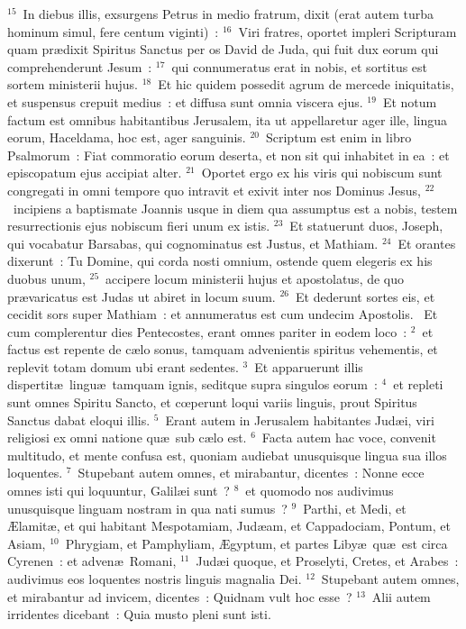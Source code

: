 ${}^{15}$~In diebus illis, exsurgens Petrus in medio fratrum, dixit (erat autem turba hominum simul, fere centum viginti)~:
${}^{16}$~Viri fratres, oportet impleri Scripturam quam pr\ae dixit Spiritus Sanctus per os David de Juda, qui fuit dux eorum qui comprehenderunt Jesum~:
${}^{17}$~qui connumeratus erat in nobis, et sortitus est sortem ministerii hujus.
${}^{18}$~Et hic quidem possedit agrum de mercede iniquitatis, et suspensus crepuit medius~: et diffusa sunt omnia viscera ejus.
${}^{19}$~Et notum factum est omnibus habitantibus Jerusalem, ita ut appellaretur ager ille, lingua eorum, Haceldama, hoc est, ager sanguinis.
${}^{20}$~Scriptum est enim in libro Psalmorum~: Fiat commoratio eorum deserta, et non sit qui inhabitet in ea~: et episcopatum ejus accipiat alter.
${}^{21}$~Oportet ergo ex his viris qui nobiscum sunt congregati in omni tempore quo intravit et exivit inter nos Dominus Jesus,
${}^{22}$~incipiens a baptismate Joannis usque in diem qua assumptus est a nobis, testem resurrectionis ejus nobiscum fieri unum ex istis.
${}^{23}$~Et statuerunt duos, Joseph, qui vocabatur Barsabas, qui cognominatus est Justus, et Mathiam.
${}^{24}$~Et orantes dixerunt~: Tu Domine, qui corda nosti omnium, ostende quem elegeris ex his duobus unum,
${}^{25}$~accipere locum ministerii hujus et apostolatus, de quo pr\ae varicatus est Judas ut abiret in locum suum.
${}^{26}$~Et dederunt sortes eis, et cecidit sors super Mathiam~: et annumeratus est cum undecim Apostolis.
~\lettrine[lines=10,image=true,loversize=0.05,lraise=-0.03]{E}{}t cum complerentur dies Pentecostes, erant omnes pariter in eodem loco~:
${}^{2}$~et factus est repente de c\ae lo sonus, tamquam advenientis spiritus vehementis, et replevit totam domum ubi erant sedentes.
${}^{3}$~Et apparuerunt illis dispertit\ae\ lingu\ae\ tamquam ignis, seditque supra singulos eorum~:
${}^{4}$~et repleti sunt omnes Spiritu Sancto, et cœperunt loqui variis linguis, prout Spiritus Sanctus dabat eloqui illis.
${}^{5}$~Erant autem in Jerusalem habitantes Jud\ae i, viri religiosi ex omni natione qu\ae\ sub c\ae lo est.
${}^{6}$~Facta autem hac voce, convenit multitudo, et mente confusa est, quoniam audiebat unusquisque lingua sua illos loquentes.
${}^{7}$~Stupebant autem omnes, et mirabantur, dicentes~: Nonne ecce omnes isti qui loquuntur, Galil\ae i sunt~?
${}^{8}$~et quomodo nos audivimus unusquisque linguam nostram in qua nati sumus~?
${}^{9}$~Parthi, et Medi, et \AE lamit\ae , et qui habitant Mespotamiam, Jud\ae am, et Cappadociam, Pontum, et Asiam,
${}^{10}$~Phrygiam, et Pamphyliam, \AE gyptum, et partes Liby\ae\ qu\ae\ est circa Cyrenen~: et adven\ae\ Romani,
${}^{11}$~Jud\ae i quoque, et Proselyti, Cretes, et Arabes~: audivimus eos loquentes nostris linguis magnalia Dei.
${}^{12}$~Stupebant autem omnes, et mirabantur ad invicem, dicentes~: Quidnam vult hoc esse~?
${}^{13}$~Alii autem irridentes dicebant~: Quia musto pleni sunt isti.


